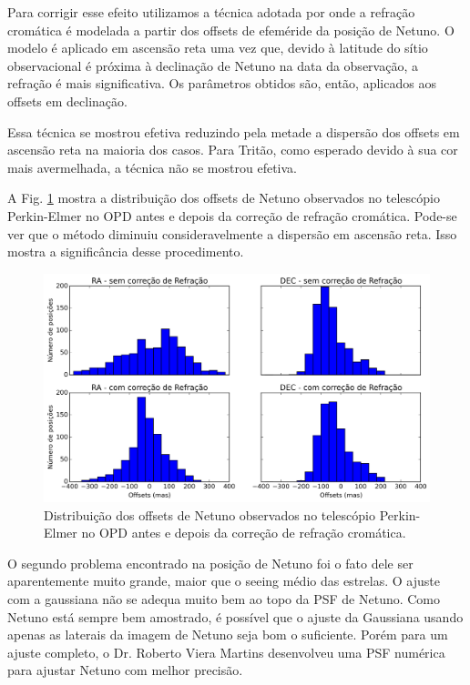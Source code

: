 \documentclass[12pt,a4paper]{report}
\begin{document}
Para corrigir esse efeito utilizamos a técnica adotada por \cite{Rossi2014} onde a refração cromática é modelada a partir dos offsets de efeméride da posição de Netuno. O modelo é aplicado em ascensão reta uma vez que, devido à latitude do sítio observacional é próxima à declinação de Netuno na data da observação, a refração é mais significativa. Os parâmetros obtidos são, então, aplicados aos offsets em declinação.

Essa técnica se mostrou efetiva reduzindo pela metade a dispersão dos offsets em ascensão reta na maioria dos casos. Para Tritão, como esperado devido à sua cor mais avermelhada, a técnica não se mostrou efetiva.

A Fig. \ref{Fig:refracao} mostra a distribuição dos offsets de Netuno observados no telescópio Perkin-Elmer no OPD antes e depois da correção de refração cromática. Pode-se ver que o método diminuiu consideravelmente a dispersão em ascensão reta. Isso mostra a significância desse procedimento.

\begin{figure}[h]
\includegraphics[width=16cm]{figuras/dist_Netuno_160.png} 
\caption{Distribuição dos offsets de Netuno observados no telescópio Perkin-Elmer no OPD antes e depois da correção de refração cromática. \label{Fig:refracao}}
\end{figure}

O segundo problema encontrado na posição de Netuno foi o fato dele ser aparentemente muito grande, maior que o seeing médio das estrelas. O ajuste com a gaussiana não se adequa muito bem ao topo da PSF de Netuno. Como Netuno está sempre bem amostrado, é possível que o ajuste da Gaussiana usando apenas as laterais da imagem de Netuno seja bom o suficiente. Porém para um ajuste completo, o Dr. Roberto Viera Martins desenvolveu uma PSF numérica para ajustar Netuno com melhor precisão.
\end{document}
